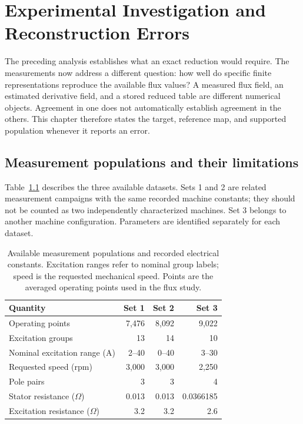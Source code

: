 \chapter{Experimental Investigation and Reconstruction Errors}\label{ch:results}

The preceding analysis establishes what an exact reduction would require. The measurements now address a different question: how well do specific finite representations reproduce the available flux values? A measured flux field, an estimated derivative field, and a stored reduced table are different numerical objects. Agreement in one does not automatically establish agreement in the others. This chapter therefore states the target, reference map, and supported population whenever it reports an error.

\section{Measurement populations and their limitations}

Table~\ref{tab:datasets} describes the three available datasets. Sets 1 and 2 are related measurement campaigns with the same recorded machine constants; they should not be counted as two independently characterized machines. Set 3 belongs to another machine configuration. Parameters are identified separately for each dataset.

\begin{table}[htbp]
\centering\small
\caption{Available measurement populations and recorded electrical constants. Excitation ranges refer to nominal group labels; speed is the requested mechanical speed. Points are the averaged operating points used in the flux study.}
\label{tab:datasets}
\begin{tabular}{lrrr}
\toprule
Quantity & Set 1 & Set 2 & Set 3\\
\midrule
Operating points & 7,476 & 8,092 & 9,022\\
Excitation groups & 13 & 14 & 10\\
Nominal excitation range (A) & 2--40 & 0--40 & 3--30\\
Requested speed (rpm) & 3,000 & 3,000 & 2,250\\
Pole pairs & 3 & 3 & 4\\
Stator resistance ($\Omega$) & 0.013 & 0.013 & 0.0366185\\
Excitation resistance ($\Omega$) & 3.2 & 3.2 & 2.6\\
\bottomrule
\end{tabular}
\end{table}

